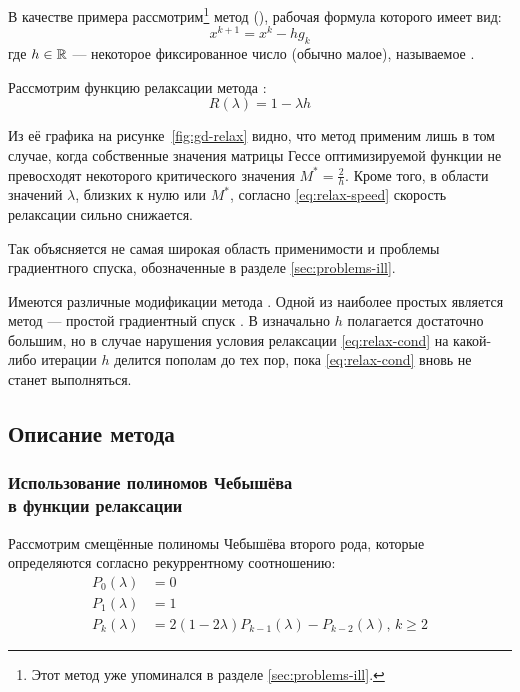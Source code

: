 В качестве примера рассмотрим\footnote{Этот метод уже упоминался в
  разделе \ref{sec:problems-ill}.} метод  (\gd{}), рабочая формула которого имеет вид:
\begin{equation}
  \label{eq:gd-workhorse}
  x^{k+1}=x^k-hg_k
\end{equation}
где $h\in\mathbb{R}$ — некоторое фиксированное число (обычно малое),
называемое .

Рассмотрим функцию релаксации метода \gd{}:
\begin{equation}
  \label{eq:gd-relax}
  R(\lambda) = 1 - \lambda h
\end{equation}



Из её графика на рисунке \ref{fig:gd-relax} видно, что метод применим
лишь в том случае, когда собственные значения матрицы Гессе
оптимизируемой функции не превосходят некоторого критического значения
$M^*=\frac{2}{h}$. Кроме того, в области значений $\lambda$, близких к
нулю или $M^*$, согласно \eqref{eq:relax-speed} скорость релаксации
сильно снижается. 

Так объясняется не самая широкая область применимости \gd{} и проблемы
градиентного спуска, обозначенные в разделе \ref{sec:problems-ill}.

Имеются различные модификации метода \gd{}. Одной из наиболее простых
является метод \rgd{} — простой градиентный спуск . В \rgd{} изначально $h$ полагается достаточно большим, но в
случае нарушения условия релаксации \eqref{eq:relax-cond} на
какой-либо итерации $h$ делится пополам до тех пор, пока
\eqref{eq:relax-cond} вновь не станет выполняться.

\subsection{Описание метода \relch{}}

\subsubsection{Использование полиномов Чебышёва\\
  в функции релаксации}

Рассмотрим смещённые полиномы Чебышёва второго рода, которые
определяются согласно рекуррентному соотношению:
\begin{align}
  \label{eq:chebyshev}
  P_0(\lambda) &= 0 \\
  P_1(\lambda) &= 1 \\
  P_k(\lambda) &= 2(1-2\lambda)P_{k-1}(\lambda) - P_{k-2}(\lambda),\, k
  \geq 2
\end{align}


